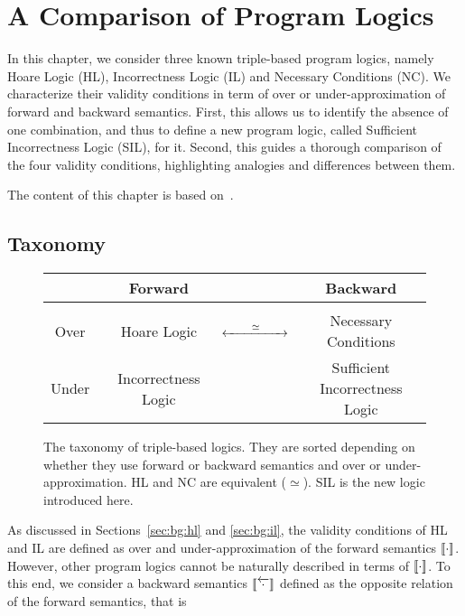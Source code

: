 
\chapter{A Comparison of Program Logics}\label{ch:sil}
In this chapter, we consider three known triple-based program logics, namely Hoare Logic (HL), Incorrectness Logic (IL) and Necessary Conditions (NC). We characterize their validity conditions in term of over or under-approximation of forward and backward semantics. First, this allows us to identify the absence of one combination, and thus to define a new program logic, called Sufficient Incorrectness Logic (SIL), for it. Second, this guides a thorough comparison of the four validity conditions, highlighting analogies and differences between them.

The content of this chapter is based on~\cite{ABGL24}.

\section{Taxonomy}
\begin{figure}[t]
	\centering
	\begin{tabular}{c|ccc}
		                   & Forward                   &                                        & Backward                                            \\[3pt]
		\hline             &                           &                                        &                                                     \\[-5pt]
		\quad Over\quad\   & \quad Hoare Logic         & $\xleftrightarrow{\qquad\simeq\qquad}$ & Necessary Conditions                                \\ [5pt]
		\quad Under\quad\  & \quad Incorrectness Logic &                                        & \textcolor{ACMBlue}{Sufficient Incorrectness Logic}
	\end{tabular}
	\caption{The taxonomy of triple-based logics. They are sorted depending on whether they use forward or backward semantics and over or under-approximation. HL and NC are equivalent ($\simeq$). SIL is the new logic introduced here.}
	\label{fig:sil:taxonomy}
\end{figure}

As discussed in Sections~\ref{sec:bg:hl} and \ref{sec:bg:il}, the validity conditions of HL and IL are defined as over and under-approximation of the forward semantics $\llbracket\cdot\rrbracket$. However, other program logics cannot be naturally described in terms of $\llbracket\cdot\rrbracket$. To this end, we consider a backward semantics $\llbracket\overleftarrow{\cdot}\rrbracket$ defined as the opposite relation of the forward semantics, that is

